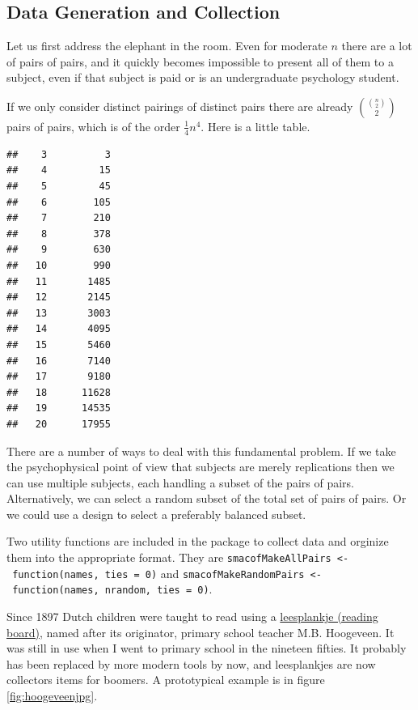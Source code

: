 \documentclass[
  12pt,
]{article}
\begin{document}
\subsection{Data Generation and Collection}\label{data-generation-and-collection}

Let us first address the elephant in the room. Even for moderate \(n\) there are a
lot of pairs of pairs, and it quickly becomes impossible to present all of them to
a subject, even if that subject is paid or is an undergraduate psychology student.

If we only consider distinct pairings of distinct pairs there are already
\(\binom{\binom{n}{2}}{2}\)
pairs of pairs, which is of the order \(\frac14n^4\). Here is a little table.

\begin{verbatim}
##    3          3 
##    4         15 
##    5         45 
##    6        105 
##    7        210 
##    8        378 
##    9        630 
##   10        990 
##   11       1485 
##   12       2145 
##   13       3003 
##   14       4095 
##   15       5460 
##   16       7140 
##   17       9180 
##   18      11628 
##   19      14535 
##   20      17955
\end{verbatim}

There are a number of ways to deal with this fundamental problem. If we take the psychophysical point of view that subjects are merely replications then we
can use multiple subjects, each handling a subset of the pairs of pairs.
Alternatively, we can select a random subset of the total set of pairs of pairs.
Or we could use a design to select a preferably balanced subset.

Two utility functions are included in the package to collect data and orginize them into the appropriate format. They are \texttt{smacofMakeAllPairs\ \textless{}-\ function(names,\ ties\ =\ 0)} and \texttt{smacofMakeRandomPairs\ \textless{}-\ function(names,\ nrandom,\ ties\ =\ 0)}.

Since 1897 Dutch children were taught to read using a
\href{https://nl.wikipedia.org/wiki/Leesplankje_van_Hoogeveen}{leesplankje (reading board)},
named after its originator, primary school teacher M.B. Hoogeveen.
It was still in use when I went to primary school in the nineteen
fifties. It probably has been replaced by more modern tools by now, and
leesplankjes are now collectors items for boomers. A prototypical example is in figure \ref{fig:hoogeveenjpg}.
\end{document}
